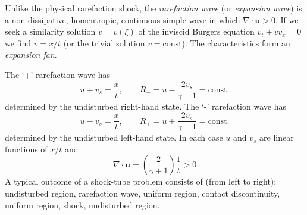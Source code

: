 \documentclass{jknotes}
\renewcommand{\u}{\symbf{u}}
\begin{document}
Unlike the physical rarefaction shock, the \emph{rarefaction wave} (or
\emph{expansion wave}) is a non-dissipative, homentropic, continuous simple
wave in which $\nabla \cdot \u > 0$. If we seek a similarity solution $v =
v(\xi)$ of the inviscid Burgers equation $v_t + vv_x = 0$ we find $v=x/t$ (or
the trivial solution $v = \text{const}$). The characteristics form an
\emph{expansion fan}.

\begin{center}
\end{center}

The `+' rarefaction wave has
\begin{equation}
	u+v_s = \frac{x}{t}, \hspace{2em} R_- = u - \frac{2 v_s}{\gamma -1} =
	\text{const.}
\end{equation}
determined by the undisturbed right-hand state. The `-' rarefaction wave has
\begin{equation}
	u-v_s = \frac{x}{t}, \hspace{2em} R_+ = u + \frac{2 v_s}{\gamma -1} =
	\text{const.}
\end{equation}
determined by the undisturbed left-hand state.  In each case $u$ and $v_s$ are
linear functions of $x/t$ and
\begin{equation}
	\nabla \cdot \u = \left(\frac{2}{\gamma +1}\right)\frac{1}{t} > 0
\end{equation}
A typical outcome of a shock-tube problem consists of (from left to right):
undisturbed region, rarefaction wave, uniform region, contact discontinuity,
uniform region, shock, undisturbed region.

\begin{center}
\end{center}
\end{document}
